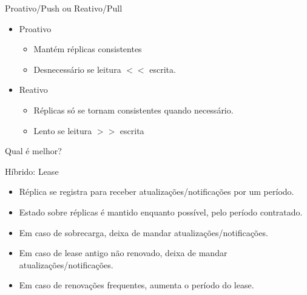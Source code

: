 \begin{frame}{Proativo/Push ou Reativo/Pull}
\begin{itemize}
	\item Proativo
	\begin{itemize}
		\item Mantém réplicas consistentes
		\item Desnecessário se leitura $<<$ escrita.
	\end{itemize}
	\item Reativo
	\begin{itemize}
		\item Réplicas só se tornam consistentes quando necessário.
		\item Lento se leitura $>>$ escrita
	\end{itemize}
\end{itemize}

Qual é melhor?
\end{frame}


\begin{frame}{Híbrido: Lease}
\begin{itemize}
	\item Réplica se registra para receber atualizações/notificações por um período.
	\item Estado sobre réplicas é mantido enquanto possível, pelo período contratado.
	\item Em caso de sobrecarga, deixa de mandar atualizações/notificações.
	\item Em caso de lease antigo não renovado, deixa de mandar atualizações/notificações.
	\item Em caso de renovações frequentes, aumenta o período do lease.
\end{itemize}
\end{frame}



